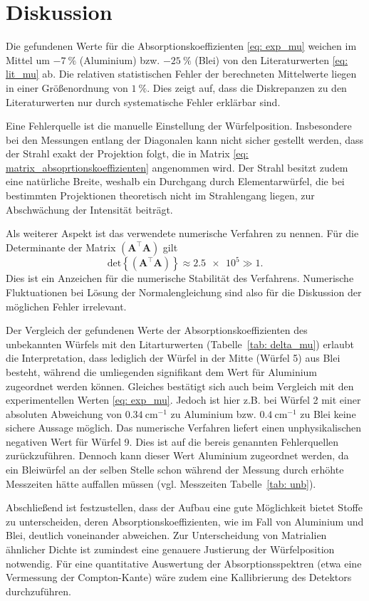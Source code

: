 \section{Diskussion}
Die gefundenen Werte für die Absorptionskoeffizienten \eqref{eq: exp_mu} weichen im Mittel
um $\SI{-7}{\percent}$ (Aluminium) bzw. $\SI{-25}{\percent}$ (Blei) von den Literaturwerten \eqref{eq: lit_mu} ab.
Die relativen statistischen Fehler der berechneten Mittelwerte liegen in einer Größenordnung von
$\SI{1}{\percent}$. Dies zeigt auf, dass die Diskrepanzen zu den Literaturwerten nur durch
systematische Fehler erklärbar sind.

Eine Fehlerquelle ist die manuelle Einstellung der Würfelposition. Insbesondere bei den Messungen
entlang der Diagonalen kann nicht sicher gestellt werden, dass der Strahl exakt der Projektion folgt,
die in Matrix \eqref{eq: matrix_absoprtionskoeffizienten} angenommen wird. Der Strahl besitzt zudem eine natürliche Breite, weshalb
ein Durchgang durch Elementarwürfel, die bei bestimmten Projektionen theoretisch nicht im Strahlengang liegen, zur
Abschwächung der Intensität beiträgt.

Als weiterer Aspekt ist das verwendete numerische Verfahren zu nennen. Für die Determinante der Matrix
$\left(\symbf{A}^\top \symbf{A}\right)$ gilt
\begin{equation}
  \mathup{det}\left\{\left(\symbf{A}^\top \symbf{A}\right)\right\} \approx \num{2.5e5} \gg 1.
\end{equation}
Dies ist ein Anzeichen für die numerische Stabilität des Verfahrens. Numerische Fluktuationen bei
Lösung der Normalengleichung sind also für die Diskussion der möglichen Fehler irrelevant.

Der Vergleich der gefundenen Werte der Absorptionskoeffizienten des unbekannten Würfels mit den
Litarturwerten (Tabelle~\ref{tab: delta_mu}) erlaubt die Interpretation, dass lediglich der
Würfel in der Mitte (Würfel 5) aus Blei besteht, während die umliegenden signifikant dem Wert %
für Aluminium zugeordnet werden können. Gleiches bestätigt sich auch beim Vergleich mit den experimentellen
Werten \eqref{eq: exp_mu}. Jedoch ist hier z.B. bei Würfel 2 mit einer absoluten Abweichung von $\SI{0.34}{\centi\meter^{-1}}$ zu Aluminium
bzw. $\SI{0.4}{\centi\meter^{-1}}$ zu Blei keine sichere Aussage möglich. Das numerische Verfahren liefert einen unphysikalischen %
negativen Wert für Würfel 9. Dies ist auf die bereis genannten Fehlerquellen zurückzuführen. %
Dennoch kann dieser Wert Aluminium zugeordnet werden, da ein Bleiwürfel an der selben Stelle schon während
der Messung durch erhöhte Messzeiten hätte auffallen müssen (vgl. Messzeiten Tabelle~\ref{tab: unb}).

Abschließend ist festzustellen, dass der Aufbau eine gute Möglichkeit bietet Stoffe zu unterscheiden, deren
Absorptionskoeffizienten, wie im Fall von Aluminium und Blei, deutlich voneinander abweichen. Zur Unterscheidung
von Matrialien ähnlicher Dichte ist zumindest eine genauere Justierung der Würfelposition notwendig.
Für eine quantitative Auswertung der Absorptionsspektren (etwa eine Vermessung der Compton-Kante) wäre zudem eine
Kallibrierung des Detektors durchzuführen.
